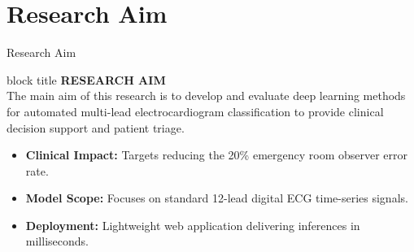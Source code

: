 \documentclass[11pt,aspectratio=169]{beamer}
\begin{document}
\section{Research Aim}
\begin{frame}{Research Aim}
    \begin{center}
        \vspace*{0.8cm}
        \begin{beamercolorbox}[sep=1em,wd=0.9\textwidth,center,rounded=true,colsep*=1.5pt]{block title}
            \color{slate}\textbf{RESEARCH AIM} \\ \vspace{0.4cm}
            \large The main aim of this research is to develop and evaluate deep learning methods for automated multi-lead electrocardiogram classification to provide clinical decision support and patient triage.
        \end{beamercolorbox}
        \vspace{0.6cm}
    \end{center}
    \begin{itemize}
        \item \textbf{Clinical Impact:} Targets reducing the 20\% emergency room observer error rate.
        \item \textbf{Model Scope:} Focuses on standard 12-lead digital ECG time-series signals.
        \item \textbf{Deployment:} Lightweight web application delivering inferences in milliseconds.
    \end{itemize}
\end{frame}

\end{document}

